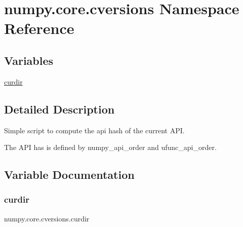 \hypertarget{namespacenumpy_1_1core_1_1cversions}{}\section{numpy.\+core.\+cversions Namespace Reference}
\label{namespacenumpy_1_1core_1_1cversions}
\subsection*{Variables}
\begin{DoxyCompactItemize}
\item 
\hyperlink{namespacenumpy_1_1core_1_1cversions_a878a594973a2f003be2b81d1c442e840}{curdir}
\end{DoxyCompactItemize}


\subsection{Detailed Description}
\begin{DoxyVerb}Simple script to compute the api hash of the current API.

The API has is defined by numpy_api_order and ufunc_api_order.\end{DoxyVerb}
 

\subsection{Variable Documentation}
\mbox{\label{namespacenumpy_1_1core_1_1cversions_a878a594973a2f003be2b81d1c442e840}} 
\subsubsection{\texorpdfstring{curdir}{curdir}}
{\footnotesize\ttfamily numpy.\+core.\+cversions.\+curdir}

